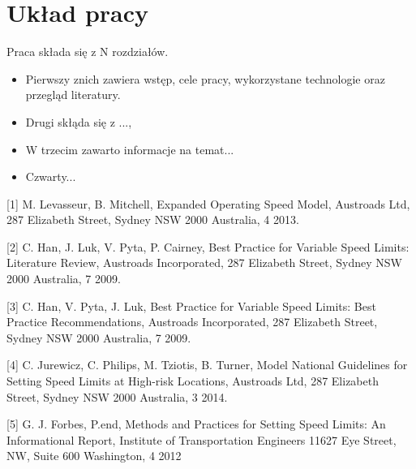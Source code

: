 	\newpage
\section{Układ pracy}
\label{sec:ukladPracy}

Praca składa się z N rozdziałów. 

\begin{itemize}
\item Pierwszy znich zawiera wstęp, cele pracy, wykorzystane technologie oraz przegląd literatury. 
\item Drugi skłąda się z ..., 
\item W trzecim zawarto informacje na temat...
\item Czwarty...
\end{itemize}


[1] M. Levasseur, B. Mitchell, Expanded Operating Speed Model, Austroads Ltd, 287 Elizabeth Street, Sydney NSW 2000 Australia, 4 2013. 

[2] C. Han, J. Luk, V. Pyta, P. Cairney, Best Practice for Variable Speed Limits: Literature Review, Austroads Incorporated, 287 Elizabeth Street, Sydney NSW 2000 Australia, 7 2009.

[3] C. Han, V. Pyta, J. Luk, Best Practice for Variable Speed Limits: Best Practice Recommendations, Austroads Incorporated, 287 Elizabeth Street, Sydney NSW 2000 Australia, 7 2009.

[4] C. Jurewicz, C. Philips, M. Tziotis, B. Turner, Model National Guidelines for Setting Speed Limits at High-risk Locations, Austroads Ltd, 287 Elizabeth Street, Sydney NSW 2000 Australia, 3 2014. 

[5] G. J. Forbes, P.end, Methods and Practices for Setting Speed Limits: An Informational Report, Institute of Transportation Engineers 11627 Eye Street, NW, Suite 600 Washington, 4 2012